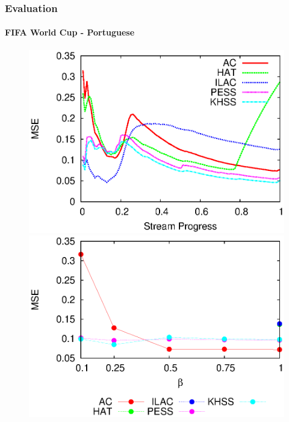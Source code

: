 \documentclass[14pt]{beamer}
\begin{document}
\begin{frame}
\frametitle{Evaluation}
\framesubtitle{FIFA World Cup - Portuguese}
\begin{figure}[htp!]
\label{fig:fm_1}
\centering
\includegraphics[scale=0.45]{pt_mse.eps}
\includegraphics[scale=0.45]{pt_le_mse.eps}
\end{figure}
\end{frame}
\end{document}
